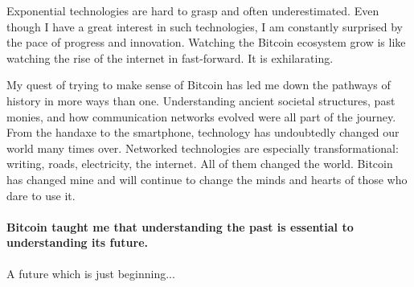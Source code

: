 Exponential technologies are hard to grasp and often underestimated.
Even though I have a great interest in such technologies, I am
constantly surprised by the pace of progress and innovation. Watching
the Bitcoin ecosystem grow is like watching the rise of the internet in
fast-forward. It is exhilarating.

My quest of trying to make sense of Bitcoin has led me down the pathways
of history in more ways than one. Understanding ancient societal
structures, past monies, and how communication networks evolved were all
part of the journey. From the handaxe to the smartphone, technology has
undoubtedly changed our world many times over. Networked technologies
are especially transformational: writing, roads, electricity, the
internet. All of them changed the world. Bitcoin has changed mine and
will continue to change the minds and hearts of those who dare to use
it.

\paragraph{Bitcoin taught me that understanding the past is essential to
understanding its future.}

A future which is just beginning...

%
%
%
%
%
